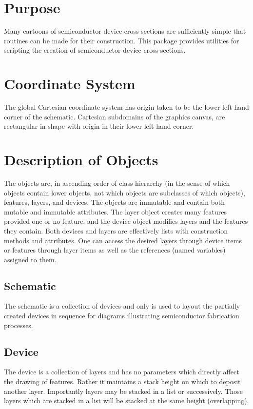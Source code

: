 \documentclass{article}
\begin{document}
\section{Purpose}
Many cartoons of semiconductor device cross-sections are sufficiently simple that routines can be made for their construction. This package provides utilities for scripting the creation of semiconductor device cross-sections. 

\section{Coordinate System}
The global Cartesian coordinate system has origin taken to be the lower left hand corner of the schematic. Cartesian subdomains of the graphics canvas, are rectangular in shape with origin in their lower left hand corner.

\section{Description of Objects}\label{sec:oop}

The objects are, in ascending order of class hierarchy (in the sense of which objects contain lower objects, not which objects are subclasses of which objects), features, layers, and devices. The objects are immutable and contain both mutable and immutable attributes. The layer object creates many features provided one or no feature, and the device object modifies layers and the features they contain. Both devices and layers are effectively lists with construction methods and attributes. One can access the desired layers through device items or features through layer items as well as the references (named variables) assigned to them.

\subsection{Schematic}
The schematic is a collection of devices and only is used to layout the partially created devices in sequence for diagrams illustrating semiconductor fabrication processes.

\subsection{Device}
The device is a collection of layers and has no parameters which directly affect the drawing of features. Rather it maintains a stack height on which to deposit another layer. Importantly layers may be stacked in a list or successively. Those layers which are stacked in a list will be stacked at the same height (overlapping).
\end{document}
